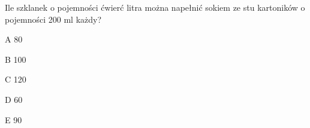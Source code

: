 \begin{tresc}
Ile szklanek o pojemności ćwierć litra można napełnić sokiem ze stu kartoników o pojemności 200 ml każdy?
\end{tresc}
\begin{wariant}{A} 80 \end{wariant}
\begin{wariant}{B} 100 \end{wariant}
\begin{wariant}{C} 120 \end{wariant}
\begin{wariant}{D} 60 \end{wariant}
\begin{wariant}{E} 90 \end{wariant}
